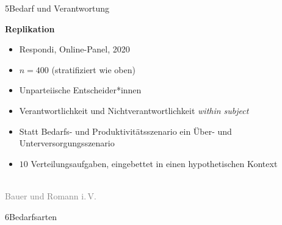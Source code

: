 \documentclass[xcolor=table,9pt,aspectratio=169]{beamer}
\begin{document}
\begin{frame}{\vspace*{10mm}5\hspace*{1em}Bedarf und Verantwortung}
\begin{multicols}{2}
\textbf{Replikation}\\
\begin{itemize}
   \item Respondi, Online-Panel, 2020
   \item $n=400$ (stratifiziert wie oben)
   \item Unparteiische Entscheider*innen
   \item Verantwortlichkeit und Nichtverantwortlichkeit \textit{within subject}
   \item Statt Bedarfs- und Produktivitätsszenario ein Über- und Unterversorgungsszenario
   \item $10$ Verteilungsaufgaben, eingebettet in einen hypothetischen Kontext
\end{itemize}
   \vfill
   \begin{center}
      \\
      \footnotesize{\textcolor{gray}{Bauer und Romann i.\,V.}}
   \end{center}
\end{multicols}
\end{frame}


\begin{frame}
\begin{overlayarea}{\textwidth}{0.81\paperheight}{
   \vspace*{11mm}
   \textcolor{uolblue}
   {6\hspace*{1em}Bedarfsarten}
}
\end{overlayarea}
\end{frame}
\end{document}
